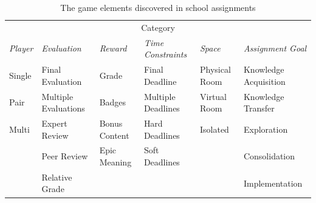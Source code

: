 \documentclass[11pt]{article}
\newcommand{\ra}[1]{\renewcommand{\arraystretch}{#1}}
\begin{document}
\begin{table}[h!t]\centering
\ra{1.3}
\footnotesize
\begin{tabular}{@{}*{6}{l @{\hspace{0.5em}} }@{}}
\toprule
\multicolumn{6}{c}{Category}  \\
\emph{Player} & \emph{Evaluation} & \emph{Reward} & \emph{Time Constraints} & \emph{Space} & \emph{Assignment Goal} \\
 \cmidrule(r){1-1} \cmidrule(r){2-2} \cmidrule(r){3-3} \cmidrule(r){4-4} \cmidrule(r){5-5} \cmidrule(r){6-6}
Single & Final Evaluation & Grade & Final Deadline & Physical Room & Knowledge Acquisition \\
Pair & Multiple Evaluations & Badges 	& Multiple Deadlines & Virtual Room & Knowledge Transfer \\
Multi & Expert Review 		& Bonus Content & Hard Deadlines & Isolated & Exploration \\
      & Peer Review 		& Epic Meaning	& Soft Deadlines & & Consolidation \\
      & Relative Grade 		&		& & &Implementation \\
\bottomrule
\end{tabular}
\caption{The game elements discovered in school assignments\label{tab:game_elements_assignments}}
\end{table}
\end{document}
